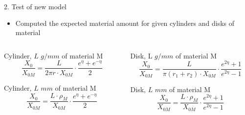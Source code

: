 \documentclass[pdftex, 11pt]{beamer}
\begin{document}
\begin{frame}{2. Test of new model}
  \begin{itemize}
  \item Computed the \alert{expected} material amount for given cylinders and disks of material
  \end{itemize}
  \begin{columns}
    \begin{column}{0.47\textwidth}
      \begin{block}{Cylinder, \alert{$L$} $g/mm$ of material \alert{M}}
        $$
        \frac{X_0}{X_{0M}} = \frac{L}{2\pi r \cdot X_{0M}} \cdot \frac{e^\eta+e^{-\eta}}{2}
        $$
      \end{block}
      \begin{block}{Cylinder, \alert{$L$} $mm$ of material \alert{M}}
        $$
        \frac{X_0}{X_{0M}} = \frac{L\cdot\rho_M}{X_{0M}}\cdot\frac{e^\eta+e^{-\eta}}{2}
        $$
      \end{block}
    \end{column}
    \begin{column}{0.47\textwidth}
      \begin{block}{Disk, \alert{L} $g/mm$ of material \alert{M}}
        $$
        \frac{X_0}{X_{0M}} = \frac{L}{\pi(r_1+r_2)\cdot X_{0M}}\cdot\frac{e^{2\eta}+1}{e^{2\eta}-1}
        $$
      \end{block}
      \begin{block}{Disk, \alert{$L$} $mm$ of material \alert{M}}
        $$
        \frac{X_0}{X_{0M}} = \frac{L\cdot\rho_M}{X_{0M}}\cdot\frac{e^{2\eta}+1}{e^{2\eta}-1}
        $$
      \end{block}
    \end{column}
  \end{columns}
\end{frame}
\end{document}
